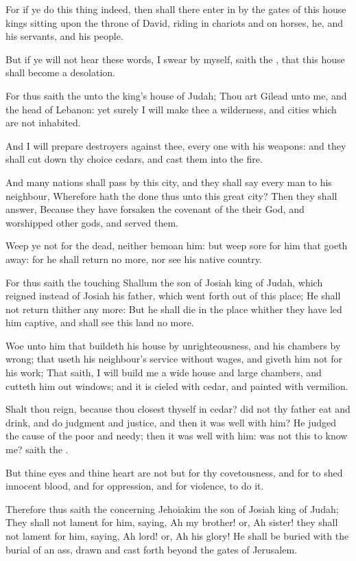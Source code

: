 \Verse For if ye do this thing indeed, then shall there enter in by the gates of this house kings sitting upon the throne of David, riding in chariots and on horses, he, and his servants, and his people.

\Verse But if ye will not hear these words, I swear by myself, saith the \LORD, that this house shall become a desolation.

\Verse For thus saith the \LORD unto the king's house of Judah; Thou art Gilead unto me, and the head of Lebanon: yet surely I will make thee a wilderness, and cities which are not inhabited.

\Verse And I will prepare destroyers against thee, every one with his weapons: and they shall cut down thy choice cedars, and cast them into the fire.

\Verse And many nations shall pass by this city, and they shall say every man to his neighbour, Wherefore hath the \LORD done thus unto this great city?  \Verse Then they shall answer, Because they have forsaken the covenant of the \LORD their God, and worshipped other gods, and served them.

\Verse Weep ye not for the dead, neither bemoan him: but weep sore for him that goeth away: for he shall return no more, nor see his native country.

\Verse For thus saith the \LORD touching Shallum the son of Josiah king of Judah, which reigned instead of Josiah his father, which went forth out of this place; He shall not return thither any more: \Verse But he shall die in the place whither they have led him captive, and shall see this land no more.

\Verse Woe unto him that buildeth his house by unrighteousness, and his chambers by wrong; that useth his neighbour's service without wages, and giveth him not for his work; \Verse That saith, I will build me a wide house and large chambers, and cutteth him out windows; and it is cieled with cedar, and painted with vermilion.

\Verse Shalt thou reign, because thou closest thyself in cedar? did not thy father eat and drink, and do judgment and justice, and then it was well with him?  \Verse He judged the cause of the poor and needy; then it was well with him: was not this to know me? saith the \LORD.

\Verse But thine eyes and thine heart are not but for thy covetousness, and for to shed innocent blood, and for oppression, and for violence, to do it.

\Verse Therefore thus saith the \LORD concerning Jehoiakim the son of Josiah king of Judah; They shall not lament for him, saying, Ah my brother! or, Ah sister! they shall not lament for him, saying, Ah lord! or, Ah his glory!  \Verse He shall be buried with the burial of an ass, drawn and cast forth beyond the gates of Jerusalem.

